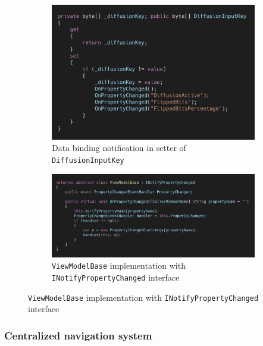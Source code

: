 \begin{figure}
\centering
\caption{Data binding notification implementation}
\label{fig:mvvm.databindingnotification}
\begin{subfigure}[t]{0.5\textwidth}
\label{fig:mvvm.onpropertychanged}
\centering
\includegraphics[width=0.99\textwidth]{figures/code/mvvm-arch/onpropertychanged.png}
\caption{Data binding notification in setter of \texttt{DiffusionInputKey}}
\end{subfigure}%
\begin{subfigure}[t]{0.5\textwidth}
\label{fig:mvvm.viewmodelbase}
\centering
\includegraphics[width=0.99\textwidth]{figures/code/mvvm-arch/viewmodelbase.png}
\caption{\texttt{ViewModelBase} implementation with \texttt{INotifyPropertyChanged} interface}
\end{subfigure}
\end{figure}

\subsubsection{Centralized navigation system}



